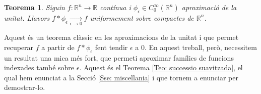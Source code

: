 \documentclass{article}
\numberwithin{equation}{section}
\newtheorem{teorema}{Teorema}[section]
\begin{document}
\begin{teorema}
Siguin $f:\mathbb{R}^n\rightarrow\mathbb{R}$ cont\'{i}nua i $\phi_{\epsilon}\in C_0^{\infty}(\mathbb{R}^n)$ aproximaci\'{o} de la unitat. Llavors $f*\phi_{\epsilon}\xrightarrow[\epsilon\to0]{}f$ uniformement sobre compactes de $\mathbb{R}^n$.
\end{teorema}

Aquest \'{e}s un teorema cl\`{a}ssic en les aproximacions de la unitat i que permet recuperar $f$ a partir de $f*\phi_{\epsilon}$ fent tendir $\epsilon$ a 0. En aquest treball, per\`{o}, necessitem un resultat una mica m\'{e}s fort, que permeti aproximar fam\'{i}lies de funcions indexades tamb\'{e} sobre $\epsilon$. Aquest \'{e}s el Teorema \ref{Teo: successio suavitzada}, el qual hem enunciat a la Secci\'{o} \ref{Sse: miscellania} i que tornem a enunciar per demostrar-lo.
\end{document}
